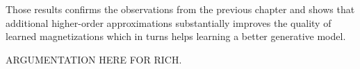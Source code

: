Those results confirms the observations from the previous chapter and shows that additional higher-order approximations substantially improves the quality of learned magnetizations which in turns helps learning a better generative model.

ARGUMENTATION HERE FOR RICH.
